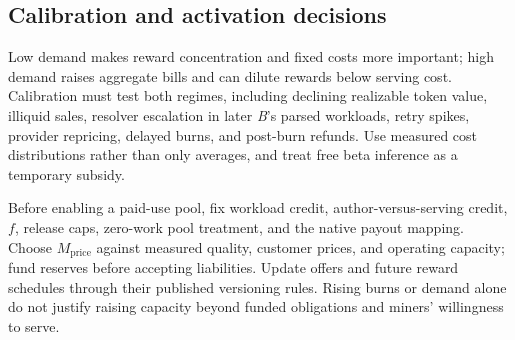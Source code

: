 \subsection{Calibration and activation decisions}

Low demand makes reward concentration and fixed costs more important; high
demand raises aggregate bills and can dilute rewards below serving cost.
Calibration must test both regimes, including declining realizable token value,
illiquid sales, resolver escalation in later \textit{B}'s parsed workloads, retry spikes, provider repricing,
delayed burns, and post-burn refunds. Use measured cost distributions rather
than only averages, and treat free beta inference as a temporary subsidy.

Before enabling a paid-use pool, fix workload credit, author-versus-serving
credit, \(f\), release caps, zero-work pool treatment, and the native payout mapping.
Choose \(M_{\mathrm{price}}\) against measured quality, customer prices, and operating capacity;
fund reserves before accepting liabilities. Update offers and future reward
schedules through their published versioning rules. Rising burns or demand
alone do not justify raising capacity beyond funded obligations and miners'
willingness to serve.
